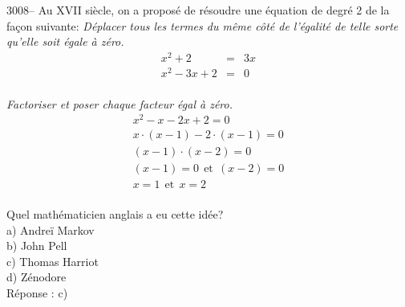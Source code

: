 \documentclass[letterpaper, 12pt]{article}
\begin{document}
3008-- Au {\scriptsize XVII\ieme{}} si\`ecle, on a propos\'e de r\'esoudre une \'equation de degr\'e 2 de la fa\c con suivante: \og \emph{D\'eplacer tous les termes du m\^eme c\^ot\'e de l'\'egalit\'e de telle sorte qu'elle soit \'egale \`a z\'ero.} \fg
\begin{eqnarray*}
x^{2} + 2 &=& 3x\\
x^{2} - 3x +2 &=& 0
\end{eqnarray*}\\
\og \emph{Factoriser et poser chaque facteur \'egal \`a z\'ero.} \fg
\begin{eqnarray*}
x^{2} - x - 2x +2 = 0\\
x\cdot(x - 1) - 2\cdot(x - 1) = 0\\
(x - 1)\cdot(x - 2) = 0\\
(x - 1) = 0 \ \ \textrm{et} \ \ (x - 2) = 0\\
x = 1 \ \ \textrm{et} \ \ x = 2
\end{eqnarray*}\\
Quel math\'ematicien anglais a eu cette id\'ee?\\

a) Andre\"i Markov\\
b) John Pell\\
c) Thomas Harriot\\
d) Z\'enodore\\

R\'eponse : c)\\
\end{document}
